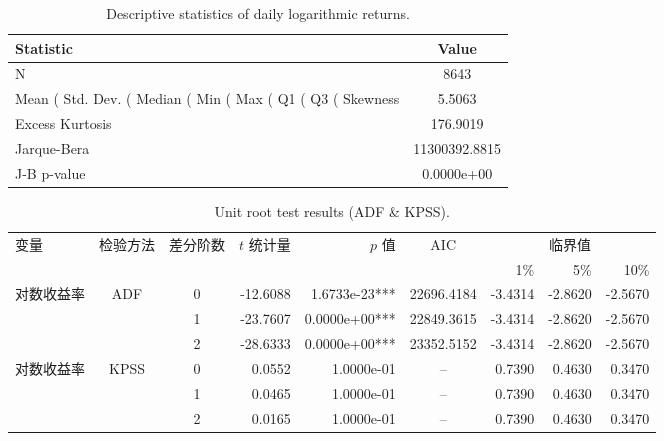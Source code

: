 
\usepackage{booktabs}
\usepackage{multirow}
\usepackage{amsmath}



\begin{table}[htbp]
  \centering
  \caption{Descriptive statistics of daily logarithmic returns.}
  \label{tab:desc_stats}
  \begin{tabular}{lc}
    \toprule
    Statistic & Value \\
    \midrule
    N & 8643 \\
    Mean (%
    Std. Dev. (%
    Median (%
    Min (%
    Max (%
    Q1 (%
    Q3 (%
    Skewness & 5.5063 \\
    Excess Kurtosis & 176.9019 \\
    Jarque-Bera & 11300392.8815 \\
    J-B p-value & 0.0000e+00 \\
    \bottomrule
  \end{tabular}
\end{table}

\begin{table}[htbp]
  \centering
  \caption{Unit root test results (ADF \& KPSS).}
  \label{tab:unit_root}
  \begin{tabular}{lccrrcrrr}
    \toprule
    \multirow{2}{*}{变量} & \multirow{2}{*}{检验方法} & \multirow{2}{*}{差分阶数} & \multirow{2}{*}{$t$ 统计量} & \multirow{2}{*}{$p$ 值} & \multirow{2}{*}{AIC} & \multicolumn{3}{c}{临界值} \\
    \cmidrule(lr){7-9}
    & & & & & & 1\% & 5\% & 10\% \\
    \midrule
    \multirow{3}{*}{对数收益率} & \multirow{3}{*}{ADF} & 0 & -12.6088 & 1.6733e-23*** & 22696.4184 & -3.4314 & -2.8620 & -2.5670 \\
     &  & 1 & -23.7607 & 0.0000e+00*** & 22849.3615 & -3.4314 & -2.8620 & -2.5670 \\
     &  & 2 & -28.6333 & 0.0000e+00*** & 23352.5152 & -3.4314 & -2.8620 & -2.5670 \\
    \multirow{3}{*}{对数收益率} & \multirow{3}{*}{KPSS} & 0 & 0.0552 & 1.0000e-01 & -- & 0.7390 & 0.4630 & 0.3470 \\
     &  & 1 & 0.0465 & 1.0000e-01 & -- & 0.7390 & 0.4630 & 0.3470 \\
     &  & 2 & 0.0165 & 1.0000e-01 & -- & 0.7390 & 0.4630 & 0.3470 \\
    \bottomrule
  \end{tabular}
\end{table}

